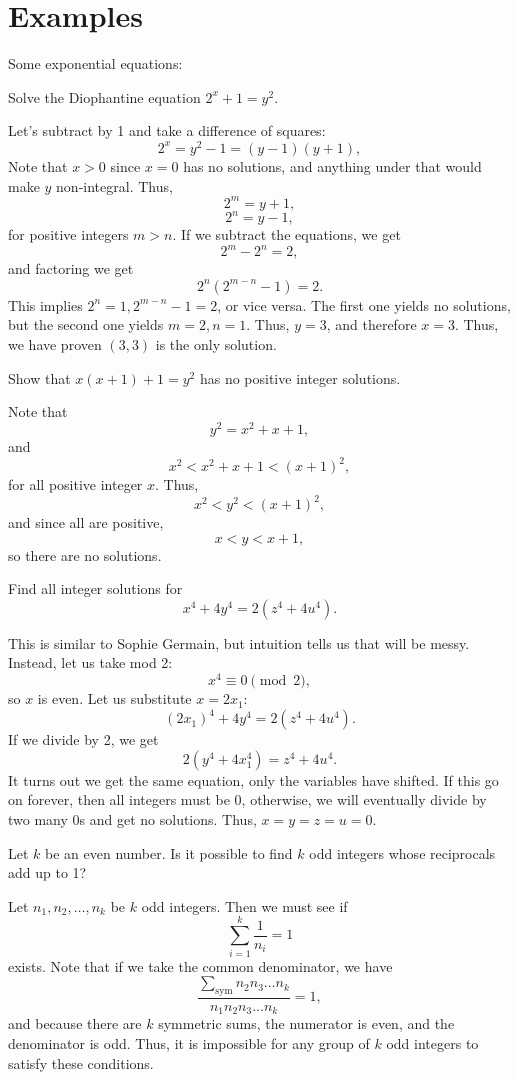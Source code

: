 \documentclass{article}
\begin{document}
\section{Examples}
Some exponential equations:
\begin{exam} 
Solve the Diophantine equation $2^x + 1 = y^2$. 
\end{exam}
\begin{sol}
Let's subtract by 1 and take a difference of squares:
$$2^x = y^2 - 1 = (y-1)(y+1),$$
Note that $x>0$ since $x=0$ has no solutions, and anything under that would make $y$ non-integral. Thus,
$$2^m = y+1,$$
$$2^n = y-1,$$
for positive integers $m>n$. If we subtract the equations, we get
$$2^m - 2^n = 2,$$
and factoring we get
$$2^n (2^{m-n} - 1) = 2.$$
This implies $2^n = 1, 2^{m-n} - 1 = 2$, or vice versa. The first one yields no solutions, but the second one yields $m=2,n=1$. Thus, $y=3$, and therefore $x=3$. Thus, we have proven $(3,3)$ is the only solution.
\end{sol}
\begin{exam}
Show that $x(x+1)+1=y^2$ has no positive integer solutions. 
\end{exam}
\begin{sol}
Note that
$$y^2 = x^2+x+1,$$
and
$$x^2 < x^2+x+1 < (x+1)^2,$$
for all positive integer $x$. Thus,
$$x^2 < y^2 < (x+1)^2,$$
and since all are positive,
$$x < y < x+1,$$
so there are no solutions. 
\end{sol}
\begin{exam}
Find all integer solutions for
$$x^4+4y^4 = 2(z^4+4u^4).$$
\end{exam}
\begin{sol}
This is similar to Sophie Germain, but intuition tells us that will be messy. Instead, let us take mod 2:
$$x^4 \equiv 0 \pmod{2},$$
so $x$ is even. Let us substitute $x=2x_1$:
$$(2x_1)^4 + 4y^4 = 2(z^4 + 4u^4).$$
If we divide by 2, we get
$$2(y^4 + 4x_1^4) = z^4 + 4u^4.$$
It turns out we get the same equation, only the variables have shifted. If this go on forever, then all integers must be 0, otherwise, we will eventually divide by two many 0s and get no solutions. Thus, $x=y=z=u=0$. 
\end{sol}
\begin{exam}
Let $k$ be an even number. Is it possible to find $k$ odd integers whose reciprocals add up to 1?
\end{exam}
\begin{sol}
Let $n_1,n_2,\ldots,n_k$ be $k$ odd integers. Then we must see if
$$\sum_{i=1}^k \frac{1}{n_i} = 1$$
exists. Note that if we take the common denominator, we have
$$\frac{\sum_{\text{sym}} n_2n_3\ldots n_k}{n_1n_2n_3\ldots n_k} = 1,$$
and because there are $k$ symmetric sums, the numerator is even, and the denominator is odd. Thus, it is impossible for any group of $k$ odd integers to satisfy these conditions.
\end{sol}
\end{document}
